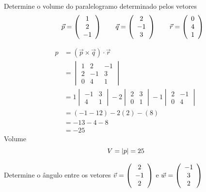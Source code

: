 \documentclass[a4paper,12pt,fleqn]{article}
\begin{document}

Determine o volume do paralelogramo determinado pelos vetores
\[
  \qquad
  \vec{p} = \left(\begin{array}{c} 1 \\ 2 \\ -1 \end{array}\right)
  \qquad
  \vec{q} = \left(\begin{array}{c} 2 \\ -1 \\ 3 \end{array}\right)
  \qquad
  \vec{r} = \left(\begin{array}{c} 0 \\ 4 \\ 1 \end{array}\right)
\]

\begin{answer}
  \begin{align*}
    p
    & = \left(\vec{p} \times \vec{q}\right) \cdot \vec{r} \\
    & = \begin{vmatrix}
          1 & 2  & -1 \\
          2 & -1 & 3  \\
          0 & 4  & 1
        \end{vmatrix}
    \\
    & = 1 \begin{vmatrix}
        -1 & 3 \\
        4  & 1
      \end{vmatrix}
      - 2 \begin{vmatrix}
        2 & 3 \\
        0 & 1
      \end{vmatrix}
      - 1 \begin{vmatrix}
        2  & -1 \\
        0  & 4
      \end{vmatrix}
    \\
    & = (-1-12) - 2(2) - (8)
    \\
    & = -13 - 4 - 8
    \\
    & = -25
  \end{align*}
  Volume
  \[
    V = \abs{p} = 25
  \]
\end{answer}

Determine o ângulo entre os vetores
\(
  \vec{v} = \left(\begin{array}{c} 2 \\ -1 \\ 2 \end{array}\right)
\) e
\(
  \vec{w} = \left(\begin{array}{c} -1 \\ 3 \\ 2 \end{array}\right)
\)
\end{document}
